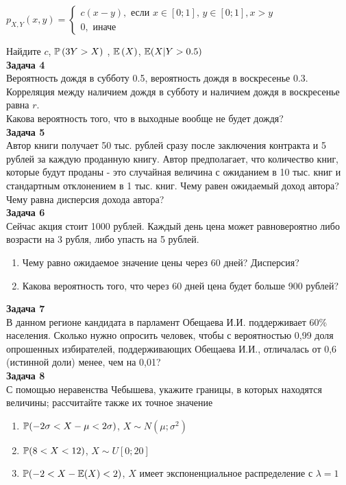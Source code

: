 \documentclass[12pt, a4paper]{article}\usepackage[]{graphicx}\usepackage[]{color}
\begin{document}
	$p_{X,Y} \left(x,y\right)=\left\{\begin{array}{l} {c(x-y),
		\text{ если } x\in \left[0;1\right],\, y\in \left[0;1\right], x>y} \\
	{0,\text{ иначе} } \end{array}\right. $

	Найдите  $c$, $\P\left(3Y>X\right)$ ,  $\E\left(X\right)$, $\E(X|Y>0.5)$ \\



	\textbf{Задача 4} \\
	Вероятность дождя в субботу 0.5, вероятность дождя в воскресенье 0.3. Корреляция между наличием дождя в субботу и наличием дождя в воскресенье равна $r$. \\
	Какова вероятность того, что в выходные вообще не будет дождя? \\



	\textbf{Задача 5} \\ %
	Автор книги получает 50 тыс. рублей сразу после заключения
	контракта и 5 рублей за каждую проданную книгу. Автор
	предполагает, что количество книг, которые будут проданы - это
	случайная величина с ожиданием в 10 тыс. книг и стандартным
	отклонением в 1 тыс. книг. Чему равен ожидаемый доход автора? Чему
	равна дисперсия дохода автора?\\



	\textbf{Задача 6} \\ %
	Сейчас акция стоит 1000 рублей. Каждый день цена может равновероятно либо возрасти на 3 рубля, либо упасть на 5 рублей.
	\begin{enumerate}
		\item Чему равно ожидаемое значение цены через 60 дней? Дисперсия?
		\item Какова вероятность того, что через 60 дней цена будет больше 900 рублей?
	\end{enumerate}


	\textbf{Задача 7} \\ %
	В данном регионе кандидата в парламент Обещаева И.И.
	поддерживает 60\% населения. Сколько нужно опросить человек, чтобы
	с вероятностью 0,99 доля  опрошенных избирателей, поддерживающих
	Обещаева И.И.,  отличалась от 0,6 (истинной доли) менее, чем на
	0,01?  \\


	\textbf{Задача 8} \\ %
	С помощью неравенства Чебышева, укажите границы, в которых
	находятся величины; рассчитайте также их точное значение
	\begin{enumerate}
		\item  $\P(-2\sigma<X-\mu<2\sigma)$, $X\sim N(\mu;\sigma^{2})$
		\item  $\P(8<X<12)$, $X\sim U[0;20]$
		\item $\P(-2<X-\E(X)<2)$, $X$ имеет экспоненциальное распределение с
		$\lambda=1$
	\end{enumerate}
\end{document}
